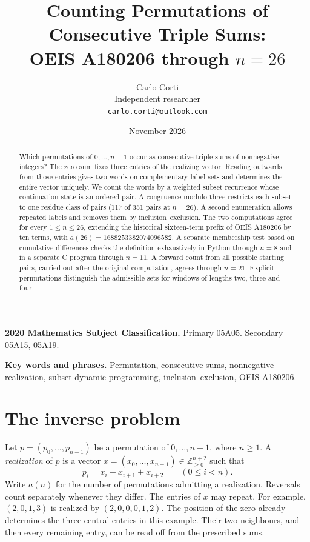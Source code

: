 \documentclass[11pt]{article}
\title{Counting Permutations of Consecutive Triple Sums:\\[2pt]
OEIS A180206 through \(n=26\)}
\author{Carlo Corti\\Independent researcher\\\texttt{carlo.corti@outlook.com}}
\date{November 2026}
\newcommand{\NN}{\mathbb Z_{\geq 0}}
\begin{document}
\maketitle

\begin{abstract}
Which permutations of \(0,\ldots,n-1\) occur as consecutive triple
sums of nonnegative integers? The zero sum fixes three entries of the
realizing vector. Reading outwards from those entries gives two words on
complementary label sets and determines the entire vector uniquely.
We count the words by a weighted subset recurrence whose continuation state
is an ordered pair. A congruence modulo three restricts each subset to one residue class
of pairs (117 of 351 pairs at \(n=26\)). A second enumeration allows repeated labels and removes
them by inclusion--exclusion. The two computations agree for every
\(1\le n\le26\), extending the historical sixteen-term prefix of
OEIS A180206 by ten terms, with \(a(26)=1688253382074096582\).
A separate membership test based on cumulative differences checks the
definition exhaustively in Python through \(n=8\) and in a separate C
program through \(n=11\). A forward count from all possible starting pairs,
carried out after the original computation, agrees through \(n=21\).
Explicit permutations distinguish
the admissible sets for windows of lengths two, three and four.
\end{abstract}

\noindent\textbf{2020 Mathematics Subject Classification.}
Primary 05A05. Secondary 05A15, 05A19.

\smallskip
\noindent\textbf{Key words and phrases.}
Permutation, consecutive sums, nonnegative realization, subset dynamic
programming, inclusion--exclusion, OEIS A180206.

\section{The inverse problem}

Let \(p=(p_0,\ldots,p_{n-1})\) be a permutation of \(0,\ldots,n-1\),
where \(n\ge1\). A \emph{realization} of \(p\) is a vector
\(x=(x_0,\ldots,x_{n+1})\in\NN^{n+2}\) such that
\begin{equation}
 p_i=x_i+x_{i+1}+x_{i+2}\qquad(0\le i<n).
 \label{eq:def}
\end{equation}
Write \(a(n)\) for the number of permutations admitting a realization. Reversals count separately
whenever they differ.
The entries of \(x\) may repeat. For example, \((2,0,1,3)\) is realized by
\((2,0,0,0,1,2)\). The position of the zero already determines the three
central entries in this example. Their two neighbours, and then every
remaining entry, can be read off from the prescribed sums.
\end{document}
